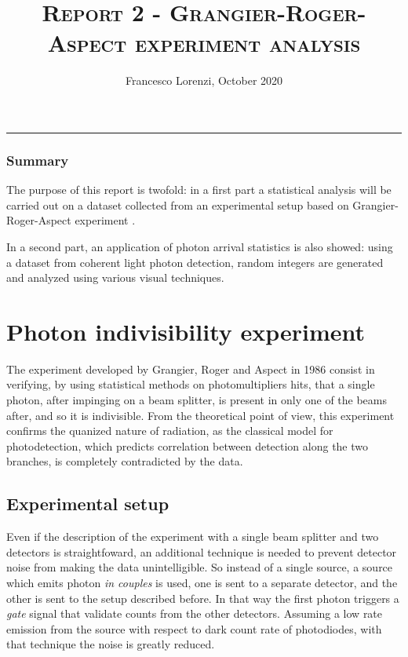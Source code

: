 \documentclass[10pt, final]{article}
\title{\textsc{Report 2 - Grangier-Roger-Aspect experiment analysis}}
\author{Francesco Lorenzi,      October 2020}
\date{}
\begin{document}
\maketitle
\vspace{-25pt}

\begin{center}
	\rule[0pt]{400pt}{0.5pt}
\end{center}
\vspace{-15pt}

\begin{multicols}{2}
\subsubsection*{Summary}
The purpose of this report is twofold: in a first part a statistical analysis will be carried out on a dataset collected from an experimental setup based on Grangier-Roger-Aspect experiment \cite{grangier}. 

In a second part, an application of photon arrival statistics is also showed: using a dataset from coherent light photon detection, random integers are generated and analyzed using various visual techniques.

\section{Photon indivisibility experiment}
The experiment developed by Grangier, Roger and Aspect in 1986 consist in verifying, by using statistical methods on photomultipliers hits, that a single  photon, after impinging on a beam splitter, is present in only one of the beams after, and so it is indivisible. 
From the theoretical point of view, this experiment confirms the quanized nature of radiation, as the classical model for photodetection, which predicts correlation between detection along the two branches, is completely contradicted by the data.
\subsection*{Experimental setup}
Even if the description of the experiment with a single beam splitter and two detectors is straightfoward, an additional technique is needed to prevent detector noise from making the data unintelligible.
So instead of a single source, a source which emits photon \emph{in couples} is used, one is sent to a separate detector, and the other is sent to the setup described before. In that way the first photon triggers a \emph{gate} signal that validate counts from the other detectors. Assuming a low rate emission from the source with respect to dark count rate of photodiodes, with that technique the noise is greatly reduced.


\end{multicols}
\end{document}
